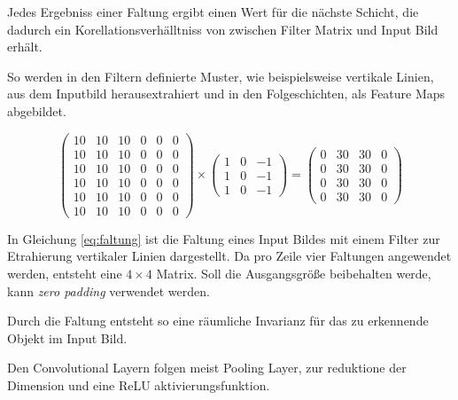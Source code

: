Jedes Ergebniss einer Faltung ergibt einen Wert für 
die nächste Schicht, die dadurch 
ein Korellationsverhälltniss von zwischen
Filter Matrix und Input Bild erhält.

So werden in den Filtern definierte Muster, wie 
beispielsweise vertikale Linien, 
aus dem Inputbild herausextrahiert und in 
den Folgeschichten, als Feature Maps abgebildet.


\vspace{1cm}
\begin{equation}
    \label{eq:faltung}
    \begin{pmatrix}
        10 & 10 & 10 & 0 & 0 & 0\\
        10 & 10 & 10 & 0 & 0 & 0\\
        10 & 10 & 10 & 0 & 0 & 0\\
        10 & 10 & 10 & 0 & 0 & 0\\
        10 & 10 & 10 & 0 & 0 & 0\\
        10 & 10 & 10 & 0 & 0 & 0
    \end{pmatrix}
    \times
    \begin{pmatrix}
        1 & 0 & -1\\
        1 & 0 & -1\\
        1 & 0 & -1
    \end{pmatrix}
    = 
    \begin{pmatrix}
        0 & 30 & 30 & 0\\
        0 & 30 & 30 & 0\\
        0 & 30 & 30 & 0\\
        0 & 30 & 30 & 0
    \end{pmatrix}
\end{equation}
\vspace{0.5cm}
\begin{figure}[H]
    \centering
    \def\svgwidth{0.6\textwidth}
    
    \caption{}
    \label{fig:faltung3}
\end{figure}

In Gleichung \ref{eq:faltung} ist die Faltung 
eines Input Bildes mit einem Filter zur Etrahierung 
vertikaler Linien dargestellt. Da pro Zeile 
vier Faltungen angewendet werden, entsteht 
eine $4\times4$ Matrix. Soll die Ausgangsgröße 
beibehalten werde, kann \textit{zero padding}
verwendet werden.

Durch die Faltung entsteht so eine räumliche 
Invarianz für das zu erkennende Objekt im 
Input Bild.

Den Convolutional Layern folgen meist Pooling Layer, 
zur reduktione der Dimension und eine ReLU aktivierungsfunktion.

